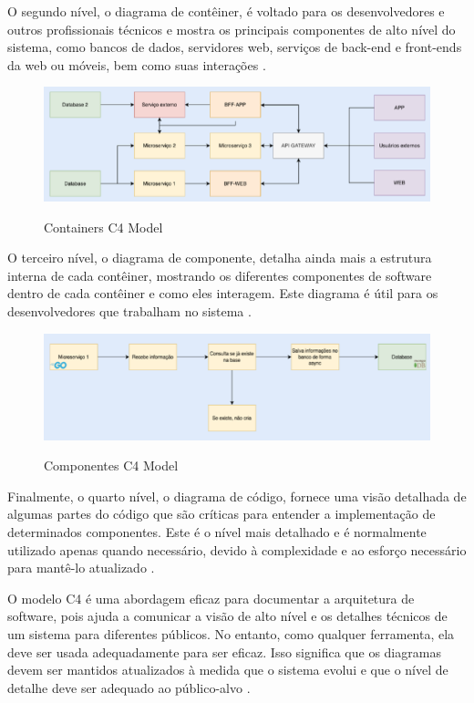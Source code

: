 O segundo nível, o diagrama de contêiner, é voltado para os desenvolvedores e outros
profissionais técnicos e mostra os principais componentes de alto nível do sistema, como bancos
de dados, servidores web, serviços de back-end e front-ends da web ou móveis, bem como suas
interações \cite{Brown2020}.

\begin{figure}[!ht]
    \centering
    \caption{Containers C4 Model}
    \includegraphics[scale=0.44]{assets/c4-containers}
    \label{fig:c4-containers}
    \tiny
    \sourcemedaddy
\end{figure}

O terceiro nível, o diagrama de componente, detalha ainda mais a estrutura interna de
cada contêiner, mostrando os diferentes componentes de software dentro de cada contêiner e
como eles interagem.
Este diagrama é útil para os desenvolvedores que trabalham no sistema \cite{Brown2020}.

\begin{figure}[!ht]
    \centering
    \caption{Componentes C4 Model}
    \includegraphics[scale=0.44]{assets/c4-components}
    \label{fig:c4-components}
    \tiny
    \sourcemedaddy
\end{figure}

Finalmente, o quarto nível, o diagrama de código, fornece uma visão detalhada de
algumas partes do código que são críticas para entender a implementação de determinados
componentes.
Este é o nível mais detalhado e é normalmente utilizado apenas quando necessário, devido à complexidade e ao esforço necessário para mantê-lo atualizado \cite{Brown2020}.

O modelo C4 é uma abordagem eficaz para documentar a arquitetura de software, pois
ajuda a comunicar a visão de alto nível e os detalhes técnicos de um sistema para diferentes
públicos.
No entanto, como qualquer ferramenta, ela deve ser usada adequadamente para ser
eficaz.
Isso significa que os diagramas devem ser mantidos atualizados à medida que o sistema
evolui e que o nível de detalhe deve ser adequado ao público-alvo \cite{Santana2021}.

